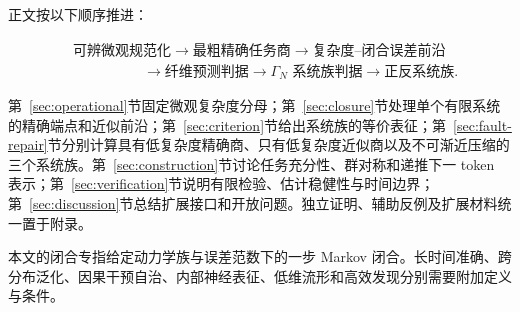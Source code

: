 正文按以下顺序推进：

\[
\begin{aligned}
&\text{可辨微观规范化}
\longrightarrow\text{最粗精确任务商}
\longrightarrow\text{复杂度--闭合误差前沿}
\\[-0.2em]
&\hspace{5em}\longrightarrow\text{纤维预测判据}
\longrightarrow\Gamma_N\text{ 系统族判据}
\longrightarrow\text{正反系统族}.
\end{aligned}
\]

第~\ref{sec:operational}节固定微观复杂度分母；第~\ref{sec:closure}节处理单个有限系统的精确端点和近似前沿；第~\ref{sec:criterion}节给出系统族的等价表征；第~\ref{sec:fault-repair}节分别计算具有低复杂度精确商、只有低复杂度近似商以及不可渐近压缩的三个系统族。第~\ref{sec:construction}节讨论任务充分性、群对称和递推下一 token 表示；第~\ref{sec:verification}节说明有限检验、估计稳健性与时间边界；第~\ref{sec:discussion}节总结扩展接口和开放问题。独立证明、辅助反例及扩展材料统一置于附录。

本文的闭合专指给定动力学族与误差范数下的一步 Markov 闭合。长时间准确、跨分布泛化、因果干预自治、内部神经表征、低维流形和高效发现分别需要附加定义与条件。
